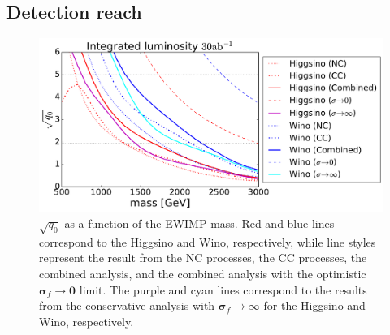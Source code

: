 \documentclass[12pt, a4paper]{article}
\begin{document}
\subsection{Detection reach}
\label{sec_detection}

\begin{figure}[t]
  \centering \includegraphics[width=0.7\hsize]{mchi_vs_sqq0.pdf}
  \caption{$\sqrt{q_0}$ as a function of the EWIMP mass.  Red and blue
  lines correspond to the Higgsino and Wino, respectively, while line
  styles represent the result from the NC processes, the CC processes,
  the combined analysis, and the combined analysis with the optimistic
  $\bm{\sigma}_f \to \bm{0}$ limit.  The purple and cyan lines
  correspond to the results from the conservative analysis with
  $\bm{\sigma}_f \to \infty$ for the Higgsino and Wino, respectively.}
  \label{fig_mchi_vs_sqq0}
\end{figure}
\end{document}
